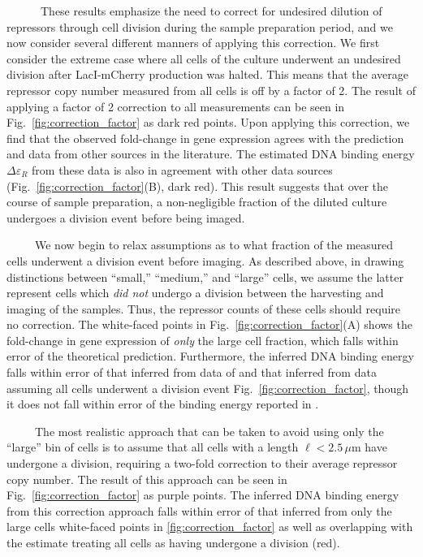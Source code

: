 \documentclass[12pt]{caltech_thesis}
\begin{document}
~~~~~~These results emphasize the need to correct for undesired dilution
of repressors through cell division during the sample preparation
period, and we now consider several different manners of applying this
correction. We first consider the extreme case where all cells of the
culture underwent an undesired division after LacI-mCherry production
was halted. This means that the average repressor copy number measured
from all cells is off by a factor of 2. The result of applying a factor
of 2 correction to all measurements can be seen in
Fig.~\ref{fig:correction_factor} as dark red points. Upon applying this
correction, we find that the observed fold-change in gene expression
agrees with the prediction and data from other sources in the
literature. The estimated DNA binding energy \(\Delta\varepsilon_R\)
from these data is also in agreement with other data sources
(Fig.~\ref{fig:correction_factor}(B), dark red). This result suggests
that over the course of sample preparation, a non-negligible fraction of
the diluted culture undergoes a division event before being imaged.

~~~~~We now begin to relax assumptions as to what fraction of the
measured cells underwent a division event before imaging. As described
above, in drawing distinctions between ``small,'' ``medium,'' and
``large'' cells, we assume the latter represent cells which \emph{did
not} undergo a division between the harvesting and imaging of the
samples. Thus, the repressor counts of these cells should require no
correction. The white-faced points in
Fig.~\ref{fig:correction_factor}(A) shows the fold-change in gene
expression of \emph{only} the large cell fraction, which falls within
error of the theoretical prediction. Furthermore, the inferred DNA
binding energy falls within error of that inferred from data of
\textcite{garcia2011} and that inferred from data assuming all cells
underwent a division event Fig.~\ref{fig:correction_factor}, though it
does not fall within error of the binding energy reported in
\textcite{garcia2011}.

~~~~~The most realistic approach that can be taken to avoid using only
the ``large'' bin of cells is to assume that all cells with a length
\(\ell < 2.5\, \mu\)m have undergone a division, requiring a two-fold
correction to their average repressor copy number. The result of this
approach can be seen in Fig.~\ref{fig:correction_factor} as purple
points. The inferred DNA binding energy from this correction approach
falls within error of that inferred from only the large cells
white-faced points in \ref{fig:correction_factor} as well as overlapping
with the estimate treating all cells as having undergone a division
(red).
\end{document}
